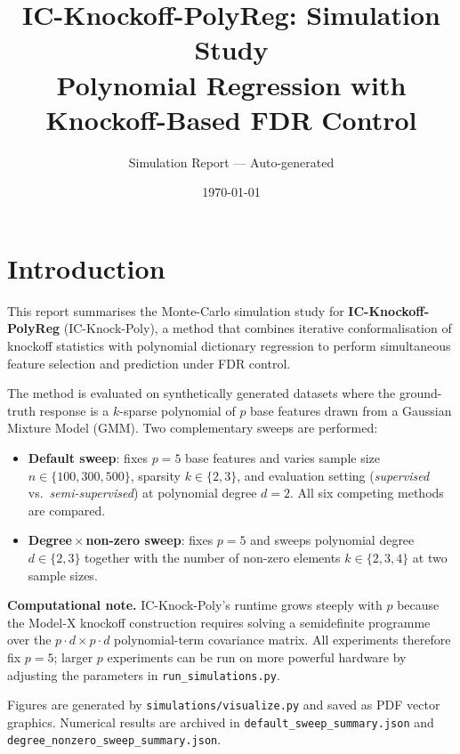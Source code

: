 \documentclass[12pt,a4paper]{article}
\title{%
  \textbf{IC-Knockoff-PolyReg: Simulation Study}\\[6pt]
  \large Polynomial Regression with Knockoff-Based FDR Control
}
\author{Simulation Report --- Auto-generated}
\date{\today}
\begin{document}
\maketitle
\tableofcontents
\newpage

\section{Introduction}
\label{sec:intro}

This report summarises the Monte-Carlo simulation study for
\textbf{IC-Knockoff-PolyReg} (IC-Knock-Poly), a method that combines
iterative conformalisation of knockoff statistics with polynomial
dictionary regression to perform simultaneous feature selection and
prediction under FDR control.

The method is evaluated on synthetically generated datasets where the
ground-truth response is a \(k\)-sparse polynomial of \(p\) base features
drawn from a Gaussian Mixture Model (GMM).
Two complementary sweeps are performed:

\begin{itemize}
  \item \textbf{Default sweep}: fixes \(p=5\) base features and varies
        sample size \(n \in \{100, 300, 500\}\), sparsity \(k \in \{2,3\}\),
        and evaluation setting (\emph{supervised} vs.\ \emph{semi-supervised})
        at polynomial degree \(d=2\).
        All six competing methods are compared.
  \item \textbf{Degree\,$\times$\,non-zero sweep}: fixes \(p=5\) and sweeps
        polynomial degree \(d \in \{2,3\}\) together with the number of
        non-zero elements \(k \in \{2,3,4\}\) at two sample sizes.
\end{itemize}

\noindent\textbf{Computational note.}
IC-Knock-Poly's runtime grows steeply with \(p\) because the
Model-X knockoff construction requires solving a semidefinite programme
over the \(p \cdot d \times p \cdot d\) polynomial-term covariance matrix.
All experiments therefore fix \(p = 5\); larger \(p\) experiments
can be run on more powerful hardware by adjusting the parameters in
\texttt{run\_simulations.py}.

Figures are generated by \texttt{simulations/visualize.py} and saved as
PDF vector graphics.  Numerical results are archived in
\texttt{default\_sweep\_summary.json} and
\texttt{degree\_nonzero\_sweep\_summary.json}.
\end{document}
